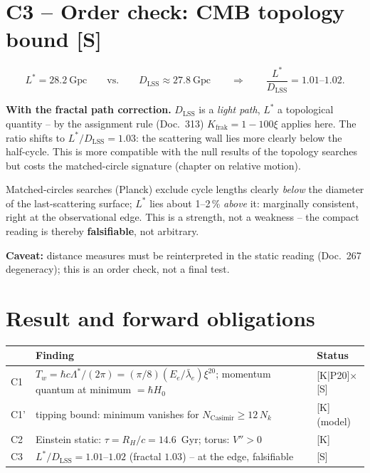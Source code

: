 \documentclass[11pt]{report}
\begin{document}
\section{C3 -- Order check: CMB topology bound [S]}

\begin{equation}
  L^{*} = 28.2~\text{Gpc}
  \qquad\text{vs.}\qquad
  D_\text{LSS} \approx 27.8~\text{Gpc}
  \qquad\Rightarrow\qquad
  \frac{L^{*}}{D_\text{LSS}} = 1.01\text{--}1.02.
\end{equation}

\textbf{With the fractal path correction.} $D_\text{LSS}$ is a
\emph{light path}, $L^{*}$ a topological quantity -- by the
assignment rule (Doc.~313) $K_\text{frak} = 1-100\xi$ applies
here. The ratio shifts to $L^{*}/D_\text{LSS} = 1.03$: the
scattering wall lies more clearly below the half-cycle. This is
more compatible with the null results of the topology searches but
costs the matched-circle signature (chapter on relative motion).

Matched-circles searches (Planck) exclude cycle lengths clearly
\emph{below} the diameter of the last-scattering surface; $L^{*}$
lies about 1--2\,\% \emph{above} it: marginally consistent, right at
the observational edge. This is a strength, not a weakness -- the
compact reading is thereby \textbf{falsifiable}, not arbitrary.

\textbf{Caveat:} distance measures must be reinterpreted in the
static reading (Doc.~267 degeneracy); this is an order check, not a
final test.

\section{Result and forward obligations}

\begin{center}
\begin{tabular}{lp{7.2cm}l}
\toprule
& Finding & Status \\
\midrule
C1 & $T_w = \hbar c\Lambda^{*}/(2\pi) = (\pi/8)(E_e/\bar\lambda_e)\xi^{20}$;
     momentum quantum at minimum $= \hbar H_0$ & [K|P20]$\times$[S] \\
C1' & tipping bound: minimum vanishes for
     $N_\text{Casimir} \ge 12\,N_k$ & [K] (model) \\
C2 & Einstein static: $\tau = R_H/c = 14.6$~Gyr;
     torus: $V'' > 0$ & [K] \\
C3 & $L^{*}/D_\text{LSS} = 1.01$--$1.02$ (fractal $1.03$) -- at the edge,
     falsifiable & [S] \\
\bottomrule
\end{tabular}
\end{center}
\end{document}
